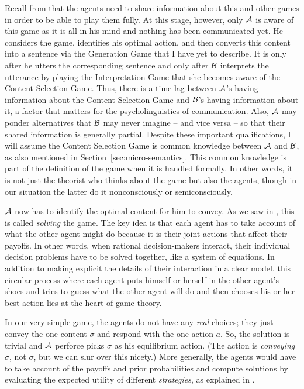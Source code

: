 
Recall from  that the agents need to share information about this and other games in order to be able to play them fully. At this stage, however, only $\cal A$ is aware of this game as it is all in his mind and nothing has been communicated yet. He considers the game, identifies his optimal action, and then converts this content into a sentence via the Generation Game that I have yet to describe. It is only after he utters the corresponding sentence and only after $\cal B$ interprets the utterance by playing the Interpretation Game that she becomes aware of the Content Selection Game. Thus, there is a time lag between $\cal A$'s having information about the Content Selection Game and $\cal B$'s having information about it, a factor that matters for the psycholinguistics of communication. Also, $\cal A$ may ponder alternatives that $\cal B$ may never imagine -- and vice versa -- so that their shared information is generally partial. Despite these important qualifications, I will assume the Content Selection Game is common knowledge between $\cal A$ and $\cal B$, as also mentioned in Section~\ref{sec:micro-semantics}. This common knowledge is part of the definition of the game when it is handled formally. In other words, it is not just the theorist who thinks about the game but also the agents, though in our situation the latter do it nonconsciously or semiconsciously. 


$\cal A$ now has to identify the optimal content for him to convey. As we saw in , this is called \emph{solving} the game. The key idea is that each agent has to take account of what the other agent might do because it is their joint actions that affect their payoffs. In other words, when rational decision-makers interact, their individual decision problems have to be solved together, like a system of equations. In addition to making explicit the details of their interaction in a clear model, this circular process where each agent puts himself or herself in the other agent's shoes and tries to guess what the other agent will do and then chooses his or her best action lies at the heart of game theory.

In our very simple game, the agents do not have any \emph{real} choices; they just convey the one content $\sigma$ and respond with the one action $a$. So, the solution is trivial and $\cal A$ perforce picks $\sigma$ as his equilibrium action. (The action is \emph{conveying} $\sigma$, not $\sigma$, but we can slur over this nicety.) More generally, the agents would have to take account of the payoffs and prior probabilities and compute solutions by evaluating the expected utility of different \emph{strategies}, as explained in . 

